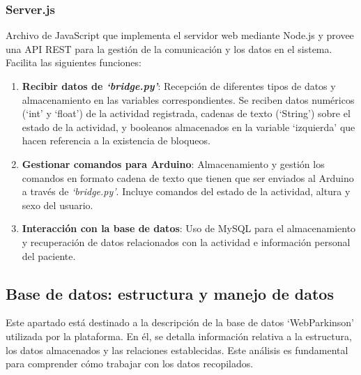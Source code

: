 \subsubsection{Server.js}
Archivo de JavaScript que implementa el servidor web mediante Node.js y provee una API REST para la gestión de la comunicación y los datos en el sistema. Facilita las siguientes funciones:

\begin{enumerate}
    \item \textbf{Recibir datos de \textit{`bridge.py'}}: Recepción de diferentes tipos de datos y almacenamiento en las variables correspondientes. Se reciben datos numéricos (`int' y `float') de la actividad registrada, cadenas de texto (`String') sobre el estado de la actividad, y booleanos almacenados en la variable `izquierda' que hacen referencia a la existencia de bloqueos.
    \item \textbf{Gestionar comandos para Arduino}: Almacenamiento y gestión los comandos en formato cadena de texto que tienen que ser enviados al Arduino a través de \textit{`bridge.py'}. Incluye comandos del estado de la actividad, altura y sexo del usuario.
    \item \textbf{Interacción con la base de datos}: Uso de MySQL para el almacenamiento y recuperación de datos relacionados con la actividad e información personal del paciente.
\end{enumerate}


\subsection{Base de datos: estructura y manejo de datos}
Este apartado está destinado a la descripción de la base de datos `WebParkinson' utilizada por la plataforma. En él, se detalla información relativa a la estructura, los datos almacenados y las relaciones establecidas. Este análisis es fundamental para comprender cómo trabajar con los datos recopilados.

